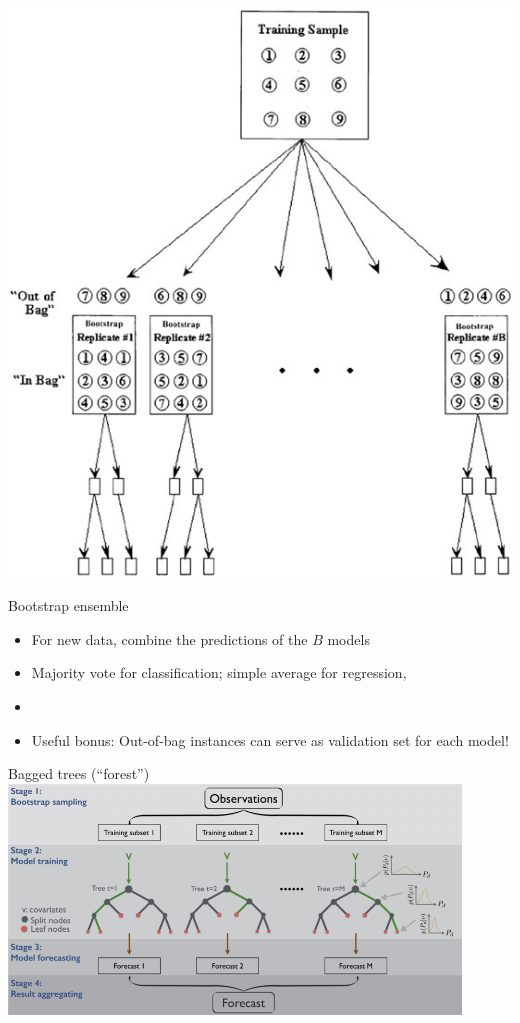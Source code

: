 \documentclass[xcolor=table,aspectratio=169]{beamer}
\begin{document}
\begin{frame}
	\includegraphics[height=0.95\textheight]{pics/bagging.png}
\end{frame}

\begin{frame}{Bootstrap ensemble}
	\begin{itemize}
		\item For new data, combine the predictions of the $B$ models
		\item Majority vote for classification; simple average for regression, 
		\item[]
		\item Useful bonus: Out-of-bag instances can serve as validation set for each model!
	\end{itemize}
\end{frame}

\begin{frame}{Bagged trees (``forest'')}
	\includegraphics[width=0.9\textwidth]{pics/rf.png}
\end{frame}
\end{document}
